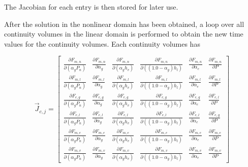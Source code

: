 The Jacobian for each entry is then stored for later use.


After the solution in the nonlinear domain has been obtained, a loop over all continuity volumes in the linear domain is performed to obtain the new time values for the continuity volumes.
Each continuity volumes has 

\begin{equation}
\label{eqn:jacobianWithFluxTerms}
\vec{J}_{c,j} = 
\begin{bmatrix}
\frac{\partial F_{m,n}}{\partial (\alpha_g P_{n})} & \frac{\partial F_{m,n}}{\partial \alpha_g } & \frac{\partial F_{m,n}}{\partial (\alpha_g h_v)} & \frac{\partial F_{m,n}}{\partial ((1.0 - \alpha_g) h_l) } & \frac{\partial F_{m,n}}{\partial \alpha_e } & \frac{\partial F_{m,n}}{\partial P } \\
\frac{\partial F_{m,l}}{\partial (\alpha_g P_{n})} & \frac{\partial F_{m,l}}{\partial \alpha_g } & \frac{\partial F_{m,l}}{\partial (\alpha_g h_v)} & \frac{\partial F_{m,l}}{\partial ((1.0 - \alpha_g) h_l)} &\frac{\partial F_{m,l}}{\partial \alpha_e } & \frac{\partial F_{m,l}}{\partial P } \\
\frac{\partial F_{e,g}}{\partial (\alpha_g P_{n})} & \frac{\partial F_{e,g}}{\partial \alpha_g } & \frac{\partial F_{e,g}}{\partial (\alpha_g h_v)} & \frac{\partial F_{e,g}}{\partial ((1.0 - \alpha_g) h_l)} &\frac{\partial F_{e,g}}{\partial \alpha_e } & \frac{\partial F_{e,l}}{\partial P } \\
\frac{\partial F_{e,l}}{\partial (\alpha_g P_{n})} & \frac{\partial F_{e,l}}{\partial \alpha_g } & \frac{\partial F_{e,l}}{\partial (\alpha_g h_v)} & \frac{\partial F_{e,l}}{\partial ((1.0 - \alpha_g) h_l)} &\frac{\partial F_{e,l}}{\partial \alpha_e } & \frac{\partial F_{e,g}}{\partial P } \\
\frac{\partial F_{m,e}}{\partial (\alpha_g P_{n})} & \frac{\partial F_{m,e}}{\partial \alpha_g } & \frac{\partial F_{m,e}}{\partial (\alpha_g h_v)} & \frac{\partial F_{m,e}}{\partial ((1.0 - \alpha_g) h_l)} &\frac{\partial F_{m,e}}{\partial \alpha_e } & \frac{\partial F_{m,e}}{\partial P } \\
\frac{\partial F_{m,v}}{\partial (\alpha_g P_{n})} & \frac{\partial F_{m,v}}{\partial \alpha_g } & \frac{\partial F_{m,v}}{\partial (\alpha_g h_v)} & \frac{\partial F_{m,v}}{\partial ((1.0 - \alpha_g) h_l)} & \frac{\partial F_{m,v}}{\partial \alpha_e } & \frac{\partial F_{m,v}}{\partial P }
\end{bmatrix}
\end{equation}
 
